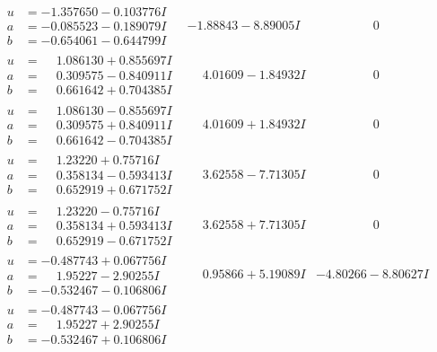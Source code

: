 \documentclass[1p]{elsarticle_modified}
\theoremstyle{definition}
\begin{document}
$$\begin{array}{c|c|c}
\begin{aligned}
u &= -1.357650 - 0.103776 I \\
a &= -0.085523 - 0.189079 I \\
b &= -0.654061 - 0.644799 I\end{aligned}
 & -1.88843 - 8.89005 I & \phantom{-0.000000 } 0 \\ \hline\begin{aligned}
u &= \phantom{-}1.086130 + 0.855697 I \\
a &= \phantom{-}0.309575 - 0.840911 I \\
b &= \phantom{-}0.661642 + 0.704385 I\end{aligned}
 & \phantom{-}4.01609 - 1.84932 I & \phantom{-0.000000 } 0 \\ \hline\begin{aligned}
u &= \phantom{-}1.086130 - 0.855697 I \\
a &= \phantom{-}0.309575 + 0.840911 I \\
b &= \phantom{-}0.661642 - 0.704385 I\end{aligned}
 & \phantom{-}4.01609 + 1.84932 I & \phantom{-0.000000 } 0 \\ \hline\begin{aligned}
u &= \phantom{-}1.23220 + 0.75716 I \\
a &= \phantom{-}0.358134 - 0.593413 I \\
b &= \phantom{-}0.652919 + 0.671752 I\end{aligned}
 & \phantom{-}3.62558 - 7.71305 I & \phantom{-0.000000 } 0 \\ \hline\begin{aligned}
u &= \phantom{-}1.23220 - 0.75716 I \\
a &= \phantom{-}0.358134 + 0.593413 I \\
b &= \phantom{-}0.652919 - 0.671752 I\end{aligned}
 & \phantom{-}3.62558 + 7.71305 I & \phantom{-0.000000 } 0 \\ \hline\begin{aligned}
u &= -0.487743 + 0.067756 I \\
a &= \phantom{-}1.95227 - 2.90255 I \\
b &= -0.532467 - 0.106806 I\end{aligned}
 & \phantom{-}0.95866 + 5.19089 I & -4.80266 - 8.80627 I \\ \hline\begin{aligned}
u &= -0.487743 - 0.067756 I \\
a &= \phantom{-}1.95227 + 2.90255 I \\
b &= -0.532467 + 0.106806 I\end{aligned}

\end{array}$$
\end{document}
